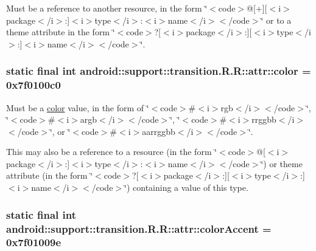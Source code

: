 Must be a reference to another resource, in the form \char`\"{}$<$code$>$@\mbox{[}+\mbox{]}\mbox{[}$<$i$>$package$<$/i$>$:\mbox{]}$<$i$>$type$<$/i$>$:$<$i$>$name$<$/i$>$$<$/code$>$\char`\"{} or to a theme attribute in the form \char`\"{}$<$code$>$?\mbox{[}$<$i$>$package$<$/i$>$:\mbox{]}\mbox{[}$<$i$>$type$<$/i$>$:\mbox{]}$<$i$>$name$<$/i$>$$<$/code$>$\char`\"{}. \hypertarget{classandroid_1_1support_1_1transition_1_1_r_1_1attr_bfa61d24695d37473e86b47505bc2892}{
\subsubsection[{color}]{\setlength{\rightskip}{0pt plus 5cm}static final int android::support::transition.R.R::attr::color = 0x7f0100c0}}
\label{classandroid_1_1support_1_1transition_1_1_r_1_1attr_bfa61d24695d37473e86b47505bc2892}


Must be a \hyperlink{classandroid_1_1support_1_1transition_1_1_r_1_1color}{color} value, in the form of \char`\"{}$<$code$>$\#$<$i$>$rgb$<$/i$>$$<$/code$>$\char`\"{}, \char`\"{}$<$code$>$\#$<$i$>$argb$<$/i$>$$<$/code$>$\char`\"{}, \char`\"{}$<$code$>$\#$<$i$>$rrggbb$<$/i$>$$<$/code$>$\char`\"{}, or \char`\"{}$<$code$>$\#$<$i$>$aarrggbb$<$/i$>$$<$/code$>$\char`\"{}. 

This may also be a reference to a resource (in the form \char`\"{}$<$code$>$@\mbox{[}$<$i$>$package$<$/i$>$:\mbox{]}$<$i$>$type$<$/i$>$:$<$i$>$name$<$/i$>$$<$/code$>$\char`\"{}) or theme attribute (in the form \char`\"{}$<$code$>$?\mbox{[}$<$i$>$package$<$/i$>$:\mbox{]}\mbox{[}$<$i$>$type$<$/i$>$:\mbox{]}$<$i$>$name$<$/i$>$$<$/code$>$\char`\"{}) containing a value of this type. \hypertarget{classandroid_1_1support_1_1transition_1_1_r_1_1attr_5cb66ca0533d934bfdb5c997f01a40cc}{
\subsubsection[{colorAccent}]{\setlength{\rightskip}{0pt plus 5cm}static final int android::support::transition.R.R::attr::colorAccent = 0x7f01009e}}
\label{classandroid_1_1support_1_1transition_1_1_r_1_1attr_5cb66ca0533d934bfdb5c997f01a40cc}


